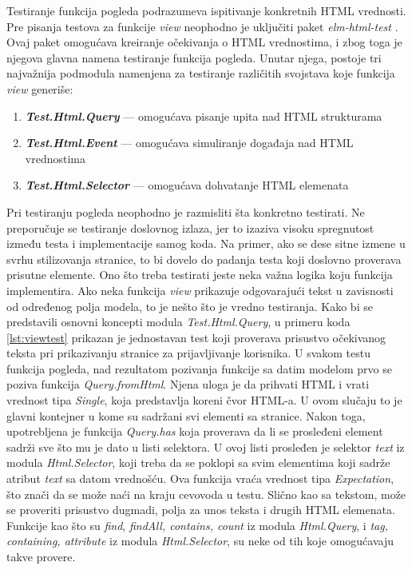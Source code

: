 \documentclass[12pt,oneside]{memoir}
\begin{document}
\par Testiranje funkcija pogleda podrazumeva ispitivanje konkretnih HTML vrednosti. Pre pisanja testova za funkcije \emph{view} neophodno je uključiti paket \emph{elm-html-test} \cite{html-elm-test}. Ovaj paket omogućava kreiranje očekivanja o HTML vrednostima, i zbog toga je njegova glavna namena testiranje funkcija pogleda. Unutar njega, postoje tri najvažnija podmodula namenjena za testiranje različitih svojstava koje funkcija \emph{view} generiše:

\begin{enumerate}
\item \textbf{\emph{Test.Html.Query}} --- omogućava pisanje upita nad HTML strukturama
\item \textbf{\emph{Test.Html.Event}} --- omogućava simuliranje događaja nad HTML vrednostima
\item \textbf{\emph{Test.Html.Selector}} --- omogućava dohvatanje HTML elemenata
\end{enumerate}

\par Pri testiranju pogleda neophodno je razmisliti šta konkretno testirati. Ne preporučuje se testiranje doslovnog izlaza, jer to izaziva visoku spregnutost između testa i implementacije samog koda. Na primer, ako se dese sitne izmene u svrhu stilizovanja stranice, to bi dovelo do padanja testa koji doslovno proverava prisutne elemente. Ono što treba testirati jeste neka važna logika koju funkcija implementira. Ako neka funkcija \emph{view} prikazuje odgovarajući tekst u zavisnosti od određenog polja modela, to je nešto što je vredno testiranja. Kako bi se predstavili osnovni koncepti modula \emph{Test.Html.Query}, u primeru koda \ref{lst:viewtest} prikazan je jednostavan test koji proverava prisustvo očekivanog teksta pri prikazivanju stranice za prijavljivanje korisnika. U svakom testu funkcija pogleda, nad rezultatom pozivanja funkcije sa datim modelom prvo se poziva funkcija \emph{Query.fromHtml}. Njena uloga je da prihvati HTML i vrati vrednost tipa \emph{Single}, koja predstavlja koreni čvor HTML-a. U ovom slučaju to je glavni kontejner u kome su sadržani svi elementi sa stranice. Nakon toga, upotrebljena je funkcija \emph{Query.has} koja proverava da li se prosleđeni element sadrži sve što mu je dato u listi selektora. U ovoj listi prosleđen je selektor \emph{text} iz modula \emph{Html.Selector}, koji treba da se poklopi sa svim elementima koji sadrže atribut \emph{text} sa datom vrednošću. Ova funkcija vraća vrednost tipa \emph{Expectation}, što znači da se može naći na kraju cevovoda u testu. Slično kao sa tekstom, može se proveriti prisustvo dugmadi, polja za unos teksta i drugih HTML elemenata. Funkcije kao što su \emph{find}, \emph{findAll, contains, count} iz modula \emph{Html.Query}, i \emph{tag, containing, attribute} iz modula \emph{Html.Selector}, su neke od tih koje omogućavaju takve provere.
\end{document}
